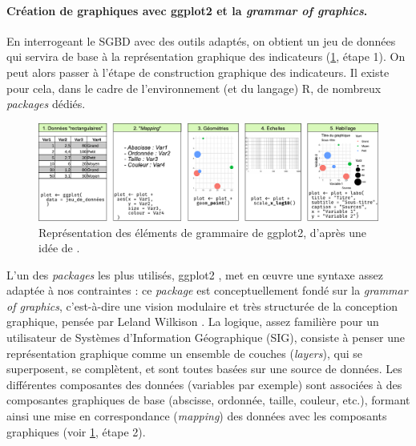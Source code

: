 \paragraph{Création de graphiques avec \textsf{ggplot2} et la \og \textit{grammar of graphics}\fg{}.}

En interrogeant le SGBD avec des outils adaptés, on obtient un jeu de données qui servira de base à la représentation graphique des indicateurs (\cref{fig:socviz-ggplot2}, étape 1).
On peut alors passer à l'étape de construction graphique des indicateurs.
Il existe pour cela, dans le cadre de l'environnement (et du langage) \textsf{R}, de nombreux \textit{packages} dédiés.

\begin{figure}[H]
	\centering
	\captionsetup{width=0.9\linewidth}
	\includegraphics[width=\linewidth]{img/grammar-graphics-steps.pdf}
	\caption[Les éléments de grammaire de \textsf{ggplot2}.]{Représentation des éléments de grammaire de \textsf{ggplot2}, d'après une idée de \textcite{healy_data_2018}.
	}
	\label{fig:socviz-ggplot2}
\end{figure}

L'un des \textit{packages} les plus utilisés, \textsf{ggplot2} \autocite{wickham_ggplot2_2016}, met en œuvre une syntaxe assez adaptée à nos contraintes : ce \textit{package} est conceptuellement fondé sur la \og \textit{grammar of graphics}\fg{}, c'est-à-dire une vision modulaire et très structurée de la conception graphique, pensée par Leland Wilkison \autocite{wilkinson_grammar_2006}.
La logique, assez familière pour un utilisateur de Systèmes d'Information Géographique (SIG), consiste à penser une représentation graphique comme un ensemble de couches (\textit{layers}), qui se superposent, se complètent, et sont toutes basées sur une source de données.
Les différentes composantes des données (variables par exemple) sont associées à des composantes graphiques de base (abscisse, ordonnée, taille, couleur, etc.), formant ainsi une mise en correspondance (\textit{mapping}) des données avec les composants graphiques (voir \cref{fig:socviz-ggplot2}, étape 2).
\clearpage

